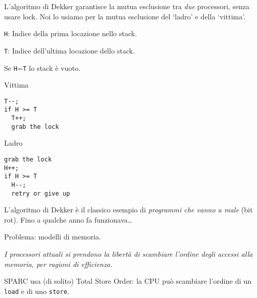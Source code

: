 \documentclass[times,sans-serif]{athenaslides}
\begin{document}
\begin{slide}
  L'algoritmo di Dekker garantisce la mutua esclusione tra 
  \emph{due} processori, senza usare lock.  Noi lo usiamo per
  la mutua esclusione del `ladro' e della `vittima'.

  \texttt{H}: Indice della prima locazione nello stack.

  \texttt{T}: Indice dell'ultima locazione dello stack.

  Se \texttt{H}=\texttt{T} lo stack \`e vuoto.

  \begin{minipage}[t]{.5\linewidth}
    \centerline{Vittima}
\begin{verbatim}
T--;
if H >= T
  T++;
  grab the lock
\end{verbatim}
  \end{minipage}
  \begin{minipage}[t]{.5\linewidth}
    \centerline{Ladro}
\begin{verbatim}
grab the lock
H++;
if H >= T
  H--;
  retry or give up
\end{verbatim}
  \end{minipage}
\end{slide}
\begin{slide}
  L'algoritmo di Dekker \`e il classico esempio di 
  \emph{programmi che vanno a male} (bit rot).  Fino a qualche
  anno fa funzionava\ldots

  \bigskip
  \begin{Red}
    \centerline{Problema: modelli di memoria.}
  \end{Red}
  \bigskip
  
  \emph{I processori attuali si prendono la libert\`a di scambiare
    l'ordine degli accessi alla memoria, per ragioni di efficienza.}

  SPARC usa (di solito) Total Store Order: la CPU pu\`o scambiare
  l'ordine di un \texttt{load} e di uno \texttt{store}.
\end{slide}
\end{document}
